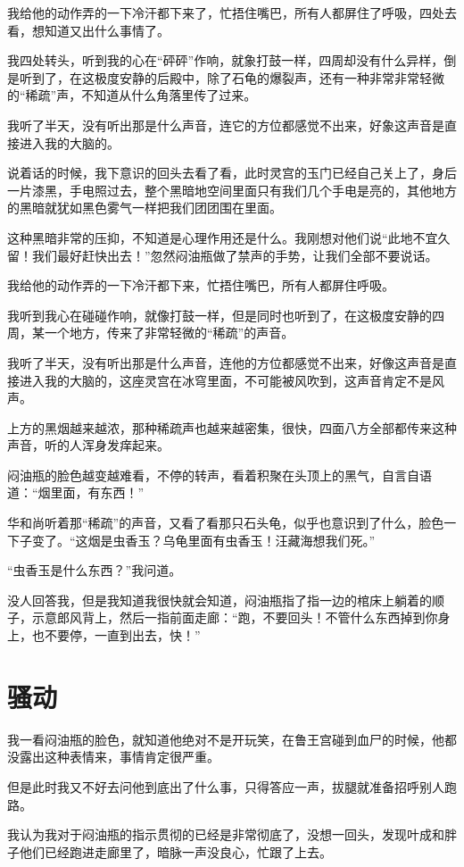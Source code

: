 我给他的动作弄的一下冷汗都下来了，忙捂住嘴巴，所有人都屏住了呼吸，四处去看，想知道又出什么事情了。

我四处转头，听到我的心在“砰砰”作响，就象打鼓一样，四周却没有什么异样，倒是听到了，在这极度安静的后殿中，除了石龟的爆裂声，还有一种非常非常轻微的“稀疏”声，不知道从什么角落里传了过来。

我听了半天，没有听出那是什么声音，连它的方位都感觉不出来，好象这声音是直接进入我的大脑的。

说着话的时候，我下意识的回头去看了看，此时灵宫的玉门已经自己关上了，身后一片漆黑，手电照过去，整个黑暗地空间里面只有我们几个手电是亮的，其他地方的黑暗就犹如黑色雾气一样把我们团团围在里面。

这种黑暗非常的压抑，不知道是心理作用还是什么。我刚想对他们说“此地不宜久留！我们最好赶快出去！”忽然闷油瓶做了禁声的手势，让我们全部不要说话。

我给他的动作弄的一下冷汗都下来，忙捂住嘴巴，所有人都屏住呼吸。

我听到我心在碰碰作响，就像打鼓一样，但是同时也听到了，在这极度安静的四周，某一个地方，传来了非常轻微的“稀疏”的声音。

我听了半天，没有听出那是什么声音，连他的方位都感觉不出来，好像这声音是直接进入我的大脑的，这座灵宫在冰穹里面，不可能被风吹到，这声音肯定不是风声。

上方的黑烟越来越浓，那种稀疏声也越来越密集，很快，四面八方全部都传来这种声音，听的人浑身发痒起来。

闷油瓶的脸色越变越难看，不停的转声，看着积聚在头顶上的黑气，自言自语道：“烟里面，有东西！”

华和尚听着那“稀疏”的声音，又看了看那只石头龟，似乎也意识到了什么，脸色一下子变了。“这烟是虫香玉？乌龟里面有虫香玉！汪藏海想我们死。”

“虫香玉是什么东西？”我问道。

没人回答我，但是我知道我很快就会知道，闷油瓶指了指一边的棺床上躺着的顺子，示意郎风背上，然后一指前面走廊：“跑，不要回头！不管什么东西掉到你身上，也不要停，一直到出去，快！”

\chapter{骚动}

我一看闷油瓶的脸色，就知道他绝对不是开玩笑，在鲁王宫碰到血尸的时候，他都没露出这种表情来，事情肯定很严重。

但是此时我又不好去问他到底出了什么事，只得答应一声，拔腿就准备招呼别人跑路。

我认为我对于闷油瓶的指示贯彻的已经是非常彻底了，没想一回头，发现叶成和胖子他们已经跑进走廊里了，暗脉一声没良心，忙跟了上去。

